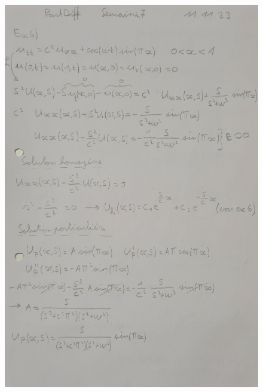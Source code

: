 \begin{figure}[H]
    \centering
    \includegraphics[height=\textheight-1cm, width=\columnwidth]{images/semaine7_exemple_laplace4.jpg}
\end{figure}
